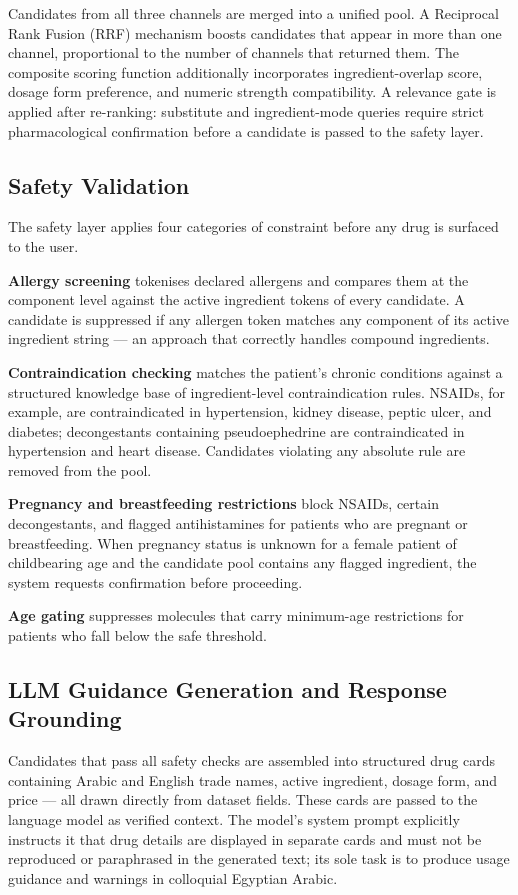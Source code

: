 \documentclass[12pt,a4paper]{article}
\begin{document}
Candidates from all three channels are merged into a unified pool.
A Reciprocal Rank Fusion (RRF) mechanism boosts candidates that appear
in more than one channel, proportional to the number of channels that
returned them. The composite scoring function additionally incorporates
ingredient-overlap score, dosage form preference, and numeric strength
compatibility. A relevance gate is applied after re-ranking: substitute
and ingredient-mode queries require strict pharmacological confirmation
before a candidate is passed to the safety layer.

\subsection{Safety Validation}

The safety layer applies four categories of constraint before any drug
is surfaced to the user.

\textbf{Allergy screening} tokenises declared allergens and compares them
at the component level against the active ingredient tokens of every
candidate. A candidate is suppressed if any allergen token matches any
component of its active ingredient string --- an approach that correctly
handles compound ingredients.

\textbf{Contraindication checking} matches the patient's chronic conditions
against a structured knowledge base of ingredient-level contraindication
rules. NSAIDs, for example, are contraindicated in hypertension, kidney
disease, peptic ulcer, and diabetes; decongestants containing
pseudoephedrine are contraindicated in hypertension and heart disease.
Candidates violating any absolute rule are removed from the pool.

\textbf{Pregnancy and breastfeeding restrictions} block NSAIDs, certain
decongestants, and flagged antihistamines for patients who are pregnant
or breastfeeding. When pregnancy status is unknown for a female patient
of childbearing age and the candidate pool contains any flagged ingredient,
the system requests confirmation before proceeding.

\textbf{Age gating} suppresses molecules that carry minimum-age
restrictions for patients who fall below the safe threshold.

\subsection{LLM Guidance Generation and Response Grounding}

Candidates that pass all safety checks are assembled into structured drug
cards containing Arabic and English trade names, active ingredient, dosage
form, and price --- all drawn directly from dataset fields. These cards are
passed to the language model as verified context. The model's system prompt
explicitly instructs it that drug details are displayed in separate cards
and must not be reproduced or paraphrased in the generated text; its sole
task is to produce usage guidance and warnings in colloquial Egyptian Arabic.
\end{document}
